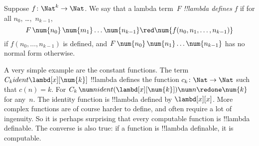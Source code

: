\documentclass[../../../include/open-logic-section]{subfiles}
\begin{document}
\begin{defn}
Suppose $f\colon \Nat^k \to \Nat$. We say that a lambda term~$F$
\emph{!!{lambda define}s} $f$ if for all 
$n_0$, \dots,~$n_{k-1}$,
\[
F \, \num{n_0} \, \num{m_1} \dots \num{n_{k-1}} \red \num{f(n_0, n_1, \dots,
  n_{k-1})}
\]
if $f(n_0, \dots, n_{k-1})$ is defined, and $F \, \num{n_0} \,
\num{n_1} \dots \num{n_{k-1}}$ has no normal form otherwise.
\end{defn}

A very simple example are the constant functions. The term $C_k ident
\lambd[x][\num{k}]$ !!{lambda define}s the function $c_k\colon \Nat \to
\Nat$ such that $c(n) = k$. For $C_k \, \num n ident
(\lambd[x][\num{k}])\num n \redone \num{k}$ for any~$n$. The identity
function is !!{lambda defined} by $\lambd[x][x]$. More complex
functions are of course harder to define, and often require a lot of
ingenuity. So it is perhaps surprising that every computable function
is !!{lambda definable}. The converse is also true: if a function is
!!{lambda definable}, it is computable.
\end{document}
